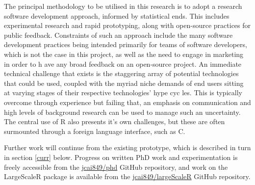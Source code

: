 The principal methodology to be utilised in this research is to adopt a research software development approach, informed by statistical ends.
This includes experimental research and rapid prototyping, along with open-source practices for public feedback.
Constraints of such an approach include the many software development practices being intended primarily for teams of software developers, which is not the case in this project, as well as the need to engage in marketing in order to h    ave any broad feedback on an open-source project.
An immediate technical challenge that exists is the staggering array of potential technologies that could be used, coupled with the myriad niche demands of end users sitting at varying stages of their respective technologies' hype cyc    les.
This is typically overcome through experience but failing that, an emphasis on communication and high levels of background research can be used to manage such an uncertainty.
The central use of R also presents it's own challenges, but these are often surmounted through a foreign language interface, such as C.

Further work will continue from the existing prototype, which is described in turn in section \ref{curr} below.
Progress on written PhD work and experimentation is freely accessible from the \href{https://github.com/jcai849/phd}{jcai849/phd} GitHub repository, and work on the LargeScaleR package is available from the \href{https://github.com/jcai849/phd}{jcai849/largeScaleR} GitHub repository.
